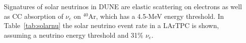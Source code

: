 Signatures of solar neutrinos in DUNE
are elastic scattering on electrons as well as CC absorption of $\nu_e$ on $^{40}$Ar, which has a 4.5-MeV energy threshold.
In Table~\ref{tab:solarnu} the solar neutrino event rate in a
 LArTPC is shown, assuming a  neutrino energy
threshold and 31\% $\nu_e$.
%
\begin{table}[!htb]
\caption[Solar neutrino rates in a LArTPC]{Solar neutrino event rates in a  LArTPC assuming 
a  neutrino energy threshold and 31\% $\nu_e$}
\label{tab:solarnu}
\end{table}



